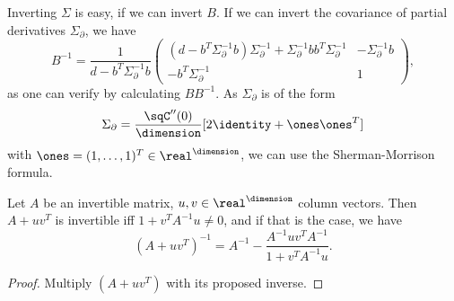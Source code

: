 Inverting \(\Sigma\) is easy, if we can invert \(B\). If we can invert the
covariance of partial derivatives \(\Sigma_\partial\), we have
\[
	B^{-1} = \frac1{d- b^T \Sigma_\partial^{-1}b}\begin{pmatrix}
		( d- b^T \Sigma_\partial^{-1}b )\Sigma_\partial^{-1}
		+ \Sigma_\partial^{-1}b b^T \Sigma_\partial^{-1}
		& -\Sigma_\partial^{-1} b\\
		-b^T\Sigma_\partial ^{-1} &  1
	\end{pmatrix},
\]
as one can verify by calculating \(BB^{-1}\). As \(\Sigma_\partial\) is of the form
\[
	\Sigma_\partial=\frac{\sqC''(0)}{\dimension}[2\identity + \ones\ones^T]
\]
with \(\ones=(1,\dots,1)^T\in\real^\dimension\), we can use the Sherman-Morrison
formula.

\begin{lemma}
	Let \(A\) be an invertible matrix, \(u,v\in\real^\dimension\) column vectors.
	Then \(A+ uv^T\) is invertible iff \(1+v^T A^{-1}u \neq 0\), and if that is
	the case, we have
	\[
		(A+uv^T)^{-1} = A^{-1} - \frac{A^{-1}u v^T A^{-1}}{1+v^T A^{-1}u}.
	\]
\end{lemma}
\begin{proof}
	Multiply \((A+uv^T)\) with its proposed inverse.
\end{proof}

